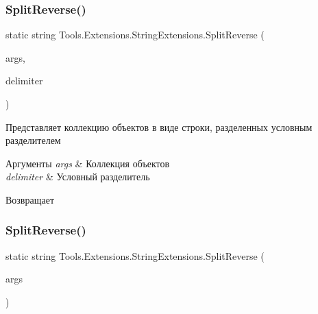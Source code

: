 \subsubsection{\texorpdfstring{Split\+Reverse()}{SplitReverse()}\hspace{0.1cm}{\footnotesize\ttfamily [1/2]}}
{\footnotesize\ttfamily static string Tools.\+Extensions.\+String\+Extensions.\+Split\+Reverse (\begin{DoxyParamCaption}\item[{this I\+Enumerable$<$ object $>$}]{args,  }\item[{string}]{delimiter }\end{DoxyParamCaption})\hspace{0.3cm}{\ttfamily [static]}}



Представляет коллекцию объектов в виде строки, разделенных условным разделителем 


\begin{DoxyParams}{Аргументы}
{\em args} & Коллекция объектов\\
\hline
{\em delimiter} & Условный разделитель\\
\hline
\end{DoxyParams}
\begin{DoxyReturn}{Возвращает}

\end{DoxyReturn}
\mbox{\label{class_tools_1_1_extensions_1_1_string_extensions_a8cb5209b6cddfb87605c26392c07bf03}} 
\subsubsection{\texorpdfstring{Split\+Reverse()}{SplitReverse()}\hspace{0.1cm}{\footnotesize\ttfamily [2/2]}}
{\footnotesize\ttfamily static string Tools.\+Extensions.\+String\+Extensions.\+Split\+Reverse (\begin{DoxyParamCaption}\item[{this I\+Enumerable$<$ object $>$}]{args }\end{DoxyParamCaption})\hspace{0.3cm}{\ttfamily [static]}}



